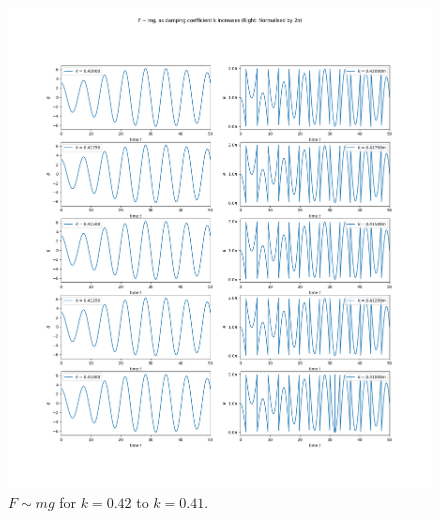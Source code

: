 \documentclass[10pt, twocolumn]{article}
\begin{document}
\begin{figure}
    \centering
    \includegraphics[width = \columnwidth]{Projects/ForcedSimplePendulum/Plots/F~mg as damping coefficient k increases from 0.42 to 0.41.png}
    \caption{$F \sim{mg}$ for $k = 0.42$ to $k = 0.41$.}
    \label{k 0.42 to 0.41}
\end{figure}
\end{document}

